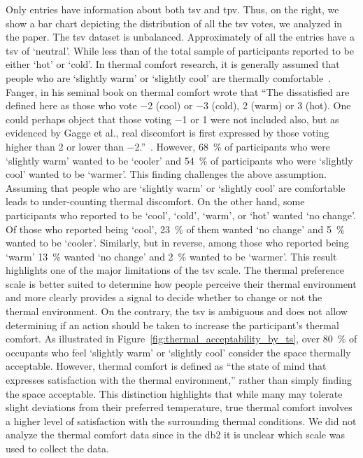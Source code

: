 Only  entries have information about both \ac{tsv} and \ac{tpv}.
Thus, on the right, we show a bar chart depicting the distribution of all the \ac{tsv} votes, we analyzed in the paper.
The \ac{tsv} dataset is unbalanced.
Approximately  of all the entries have a \ac{tsv} of `neutral'.
While less than  of the total sample of participants reported to be either `hot' or `cold'.
In thermal comfort research, it is generally assumed that people who are `slightly warm' or `slightly cool' are thermally comfortable~\cite{Fanger1970, schweiker2020evaluating}.
Fanger, in his seminal book on thermal comfort wrote that ``The dissatisfied are defined here as those who vote \num{-2} (cool) or \num{-3} (cold), \num{2} (warm) or \num{3} (hot).
One could perhaps object that those voting \num{-1} or \num{1} were not included also, but as evidenced by Gagge et al., real discomfort is first expressed by those voting higher than \num{2} or lower than \num{-2}.''~\cite{Fanger1970}.
However, \qty{68}{\percent} of participants who were `slightly warm' wanted to be `cooler' and \qty{54}{\percent} of participants who were `slightly cool' wanted to be `warmer'.
This finding challenges the above assumption.
Assuming that people who are `slightly warm' or `slightly cool' are comfortable leads to under-counting thermal discomfort.
On the other hand, some participants who reported to be `cool', `cold', `warm', or `hot' wanted `no change'.
Of those who reported being `cool', \qty{23}{\percent} of them wanted `no change' and \qty{5}{\percent} wanted to be `cooler'.
Similarly, but in reverse, among those who reported being `warm' \qty{13}{\percent} wanted `no change' and \qty{2}{\percent} wanted to be `warmer'.
This result highlights one of the major limitations of the \ac{tsv} scale.
The thermal preference scale is better suited to determine how people perceive their thermal environment and more clearly provides a signal to decide whether to change or not the thermal environment.
On the contrary, the \ac{tsv} is ambiguous and does not allow determining if an action should be taken to increase the participant's thermal comfort.
As illustrated in Figure~\ref{fig:thermal_acceptability_by_ts}, over \qty{80}{\percent} of occupants who feel `slightly warm' or `slightly cool' consider the space thermally acceptable.
However, thermal comfort is defined as ``the state of mind that expresses satisfaction with the thermal environment,'' rather than simply finding the space acceptable. 
This distinction highlights that while many may tolerate slight deviations from their preferred temperature, true thermal comfort involves a higher level of satisfaction with the surrounding thermal conditions.
We did not analyze the thermal comfort data since in the \ac{db2} it is unclear which scale was used to collect the data.


